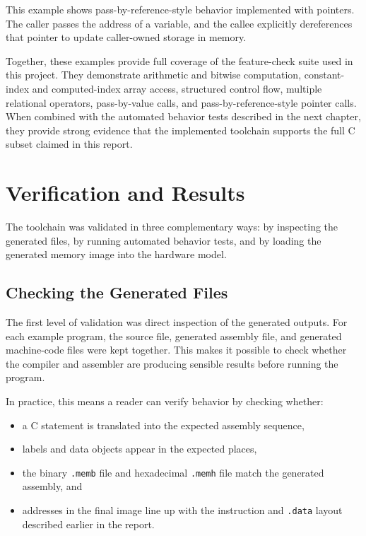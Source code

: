 \documentclass[12pt]{report}
\begin{document}
This example shows pass-by-reference-style behavior implemented with pointers. The caller passes the address of a variable, and the callee explicitly dereferences that pointer to update caller-owned storage in memory.

Together, these examples provide full coverage of the feature-check suite used in this project. They demonstrate arithmetic and bitwise computation, constant-index and computed-index array access, structured control flow, multiple relational operators, pass-by-value calls, and pass-by-reference-style pointer calls. When combined with the automated behavior tests described in the next chapter, they provide strong evidence that the implemented toolchain supports the full C subset claimed in this report.

\chapter{Verification and Results}

The toolchain was validated in three complementary ways: by inspecting the
generated files, by running automated behavior tests, and by loading the
generated memory image into the hardware model.

\section{Checking the Generated Files}

The first level of validation was direct inspection of the generated outputs.
For each example program, the source file, generated assembly file, and
generated machine-code files were kept together. This makes it possible to
check whether the compiler and assembler are producing sensible results before
running the program.

In practice, this means a reader can verify behavior by checking whether:

\begin{itemize}
    \item a C statement is translated into the expected assembly sequence,
    \item labels and data objects appear in the expected places,
    \item the binary \texttt{.memb} file and hexadecimal \texttt{.memh} file
          match the generated assembly, and
    \item addresses in the final image line up with the instruction and
          \texttt{.data} layout described earlier in the report.
\end{itemize}
\end{document}
